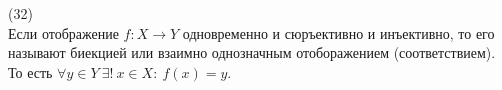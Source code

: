 (32)\\
Если отображение $f: X \to Y$ одновременно и сюръективно и инъективно, то его называют биекцией или взаимно однозначным отоборажением (соответствием). То есть $\forall y \in Y\ \exists!\ x\in X:\ f(x)=y$.